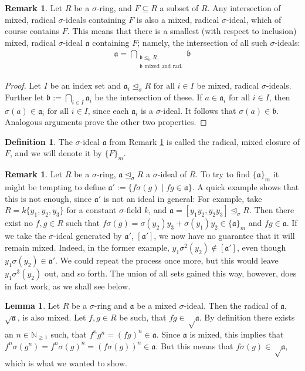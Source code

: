\documentclass{article}
\def\NE{\mathbb{N}_{\geq1}}
\def\a{\mathfrak{a}}
\def\b{\mathfrak{b}}
\def\s{\sigma}
\def\si{\unlhd_{\sigma}}
\def\fa{\text{ for all }}
\theoremstyle{definition}
\newtheorem{rem}[Satz]{Remark}
\newtheorem{defn}[Satz]{Definition}
\newtheorem{lem}[Satz]{Lemma}
\begin{document}
\begin{rem}\label{wmwelldef}
Let $R$ be a $\s$-ring, and $F \subseteq R$ a subset of $R$. Any intersection of mixed, radical $\s$-ideals containing $F$ is also a mixed, radical $\s$-ideal, which of course contains $F$. 
This means that there is a smallest (with respect to inclusion) mixed, radical $\s$-ideal $\a$ containing $F$; namely, the intersection of all such $\s$-ideals:
\begin{align*} \a = \bigcap_{\substack{ \b \si R, \\ \b \text{ mixed and rad.}}} \b \end{align*}
\begin{proof}
Let $I$ be an index set and $\a_i \si R \fa i \in I$ be mixed, radical $\s$-ideals. Further let $\b := \bigcap_{i \in I} \a_i$ be the intersection of these. If $a \in \a_i \fa i \in I$, then $\s(a) \in \a_i \fa i \in I$, since each $\a_i$ is a $\s$-ideal.
It follows that $\s(a) \in \b$. Analogous arguments prove the other two properties.
\end{proof}
\end{rem}

\begin{defn}
The $\s$-ideal $\a$ from Remark \ref{wmwelldef} is called the radical, mixed closure of $F$, and we will denote it by $\{F\}_{m}$.
\end{defn}

\begin{rem}\label{remshuffling}
Let $R$ be a $\s$-ring, $\a \si R$ a $\s$-ideal of $R$. To try to find $\{\a\}_m$ it might be tempting to define $\a':= \{ f\s(g) \mid fg \in \a \}$. A quick example shows that this is not enough, since $\a'$ is not an ideal in general: 
For example, take $R=k\{y_1,y_2,y_3\}$ for a constant $\s$-field $k$, and $\a = [y_1y_2, y_2y_3] \si R$. Then there exist no $f,g \in R$ such that $ f \s(g) = \s(y_2)y_3 + \s(y_1)y_2 \in \{\a\}_m$ and $fg \in \a$. 
If we take the $\s$-ideal generated by $\a'$, $[\a']$, we now have no guarantee that it will remain mixed. Indeed, in the former example, $y_1\s^2(y_2) \notin [\a']$, even though $y_1 \s(y_2) \in \a'$. We could repeat the process once more,
 but this would leave $y_1 \s^3(y_2)$ out, and so forth. The union of all sets gained this way, however, does in fact work, as we shall see below.
\end{rem}

\begin{lem}\label{sqrtmixed}
Let $R$ be a $\s$-ring and $\a$ be a mixed $\s$-ideal. Then the radical of $\a$, $\sqrt{\a}$, is also mixed.
Let $f,g \in R$ be such, that $fg \in \sqrt \a$. By definition there exists an $n \in \NE$ such, that $f^n g^n = (fg)^n \in \a$. Since $\a$ is mixed, this implies that $f^n \s(g^n) = f^n \s(g)^n = (f\s(g))^n \in \a$. 
But this means that $f\s(g) \in \sqrt \a$, which is what we wanted to show.
\end{lem}
\end{document}
